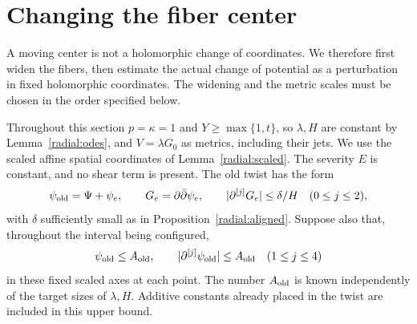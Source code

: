 \section{Changing the fiber center}\label{sec:centers}

A moving center is not a holomorphic change of coordinates. We therefore first widen the fibers, then estimate the actual change of potential as a perturbation in fixed holomorphic coordinates. The widening and the metric scales must be chosen in the order specified below.

Throughout this section $p=\kappa=1$ and $Y\ge\max\{1,t\}$, so $\lambda,H$ are constant by Lemma~\ref{radial:odes}, and $V=\lambda G_0$ as metrics, including their jets. We use the scaled affine spatial coordinates of Lemma~\ref{radial:scaled}. The severity $E$ is constant, and no shear term is present. The old twist has the form
\[
 \psi_{\rm old}=\Psi+\psi_e,
 \qquad G_e=\partial\bar\partial\psi_e,
 \qquad |\partial^{[j]}G_e|\le\delta/H\quad(0\le j\le2),
\]
with $\delta$ sufficiently small as in Proposition~\ref{radial:aligned}. Suppose also that, throughout the interval being configured,
\begin{equation}\label{center:old-data}
 \psi_{\rm old}\le A_{\rm old},\qquad
 |\partial^{[j]}\psi_{\rm old}|\le A_{\rm old}
 \quad(1\le j\le4)
\end{equation}
in these fixed scaled axes at each point. The number $A_{\rm old}$ is known independently of the target sizes of $\lambda,H$. Additive constants already placed in the twist are included in this upper bound.

